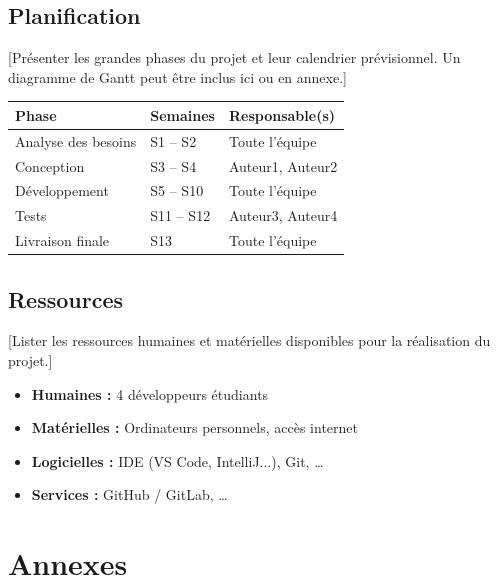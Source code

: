 \documentclass[12pt, a4paper]{article}
\begin{document}
\subsection{Planification}

[Présenter les grandes phases du projet et leur calendrier prévisionnel.
Un diagramme de Gantt peut être inclus ici ou en annexe.]

\begin{center}
\begin{tabular}{|l|l|l|}
  \hline
  \rowcolor{tabhead}
  \color{white}\textbf{Phase} &
  \color{white}\textbf{Semaines} &
  \color{white}\textbf{Responsable(s)} \\
  \hline
  Analyse des besoins & S1 -- S2 & Toute l'équipe \\
  \hline
  Conception           & S3 -- S4 & Auteur1, Auteur2 \\
  \hline
  Développement        & S5 -- S10 & Toute l'équipe \\
  \hline
  Tests                & S11 -- S12 & Auteur3, Auteur4 \\
  \hline
  Livraison finale     & S13      & Toute l'équipe \\
  \hline
\end{tabular}
\end{center}

\subsection{Ressources}

[Lister les ressources humaines et matérielles disponibles pour la réalisation
du projet.]

\begin{itemize}
  \item \textbf{Humaines :} 4 développeurs étudiants
  \item \textbf{Matérielles :} Ordinateurs personnels, accès internet
  \item \textbf{Logicielles :} IDE (VS Code, IntelliJ...), Git, \ldots
  \item \textbf{Services :} GitHub / GitLab, \ldots
\end{itemize}

\section{Annexes}
\end{document}
